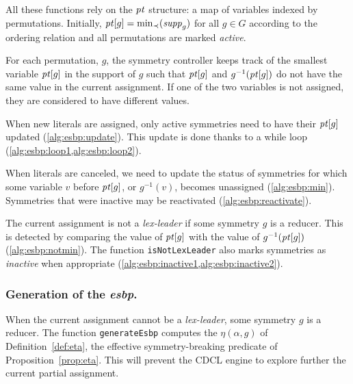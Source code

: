  All these functions rely on the $\mathit{pt}$ structure: a map of variables indexed
 by permutations. Initially, $\mathit{pt}[g] = \min_{\prec}(\mathit{supp}_g)$ for all $g \in G$ according to the ordering relation and all
 permutations are marked \textit{active}. 
 
 For each permutation, $g$, the symmetry controller keeps track of the smallest
 variable $\mathit{pt}[g]$ in the support of $g$ such that $\mathit{pt}[g]$ and
 $g^{-1}(\mathit{pt}[g])$ do not have the same value in the current assignment. If
 one of the two variables is not assigned, they are considered  to have different values.
 
 When new literals are assigned, only active symmetries need to have their
 $\mathit{pt}[g]$ updated (\cref{alg:esbp:update}). This update is done thanks to a while
 loop (\cref{alg:esbp:loop1,alg:esbp:loop2}).
 
 When literals are canceled, we need to update the status of symmetries for
 which some variable $v$ before $\mathit{pt}[g]$, or $g^{-1}(v)$, becomes unassigned
 (\cref{alg:esbp:min}). Symmetries that were inactive may be reactivated (\cref{alg:esbp:reactivate}).
 
 The current assignment is not a \textit{lex-leader} if some symmetry $g$ is a
 reducer. This is detected by comparing the value of $\mathit{pt}[g]$ with the value
 of $g^{-1}(\mathit{pt}[g])$ (\cref{alg:esbp:notmin}). The function \texttt{isNotLexLeader} also
 marks symmetries as \emph{inactive} when appropriate (\cref{alg:esbp:inactive1,alg:esbp:inactive2}).
 
 \subsubsection{Generation of the \emph{esbp}.} When the current assignment
 cannot be a \textit{lex-leader}, some symmetry $g$ is a reducer. The function
 \texttt{generateEsbp} computes the $\eta(\alpha, g)$ of Definition~\ref{def:eta},
the effective symmetry-breaking predicate of Proposition~\ref{prop:eta}. This will
 prevent the CDCL engine to explore further the current partial assignment.
 
